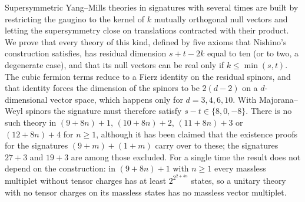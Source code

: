 Supersymmetric Yang--Mills theories in signatures with several times are built by restricting the gaugino to the kernel of $k$ mutually orthogonal null vectors and letting the supersymmetry close on translations contracted with their product. We prove that every theory of this kind, defined by five axioms that Nishino's construction satisfies, has residual dimension $s+t-2k$ equal to ten (or to two, a degenerate case), and that its null vectors can be real only if $k\le\min(s,t)$. The cubic fermion terms reduce to a Fierz identity on the residual spinors, and that identity forces the dimension of the spinors to be $2(d-2)$ on a $d$-dimensional vector space, which happens only for $d=3,4,6,10$. With Majorana--Weyl spinors the signature must therefore satisfy $s-t\in\{8,0,-8\}$. There is no such theory in $(9+8n)+1$, $(10+8n)+2$, $(11+8n)+3$ or $(12+8n)+4$ for $n\ge1$, although it has been claimed that the existence proofs for the signatures $(9+m)+(1+m)$ carry over to these; the signatures $27+3$ and $19+3$ are among those excluded. For a single time the result does not depend on the construction: in $(9+8n)+1$ with $n\ge1$ every massless multiplet without tensor charges has at least $2^{2^{2+4n}}$ states, so a unitary theory with no tensor charges on its massless states has no massless vector multiplet.
